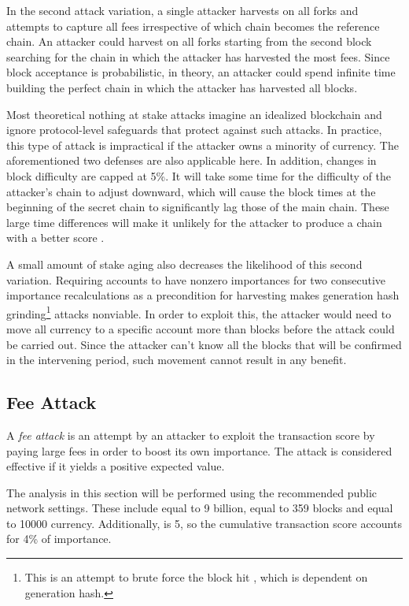 In the second attack variation, a single attacker harvests on all forks and attempts to capture all fees irrespective of which chain becomes the reference chain.
An attacker could harvest on all forks starting from the second block searching for the chain in which the attacker has harvested the most fees.
Since block acceptance is probabilistic, in theory, an attacker could spend infinite time building the perfect chain in which the attacker has harvested all blocks.

Most theoretical nothing at stake attacks imagine an idealized blockchain and ignore protocol-level safeguards that protect against such attacks.
In practice, this type of attack is impractical if the attacker owns a minority of currency.
The aforementioned two defenses are also applicable here.
In addition, changes in block difficulty  are capped at 5\%.
It will take some time for the difficulty of the attacker's chain to adjust downward, which will cause the block times at the beginning of the secret chain to significantly lag those of the main chain.
These large time differences will make it unlikely for the attacker to produce a chain with a better score .

A small amount of stake aging also decreases the likelihood of this second variation.
Requiring accounts to have nonzero importances for two consecutive importance recalculations as a precondition for harvesting makes generation hash grinding\footnote{This is an attempt to brute force the block hit , which is dependent on generation hash.} attacks nonviable.
In order to exploit this, the attacker would need to move all currency to a specific account more than  blocks before the attack could be carried out.
Since the attacker can't know all the blocks that will be confirmed in the intervening period, such movement cannot result in any benefit.

\subsection{Fee Attack}
\label{sec:consensus:feeAttack}

A \emph{fee attack} is an attempt by an attacker to exploit the transaction score by paying large fees in order to boost its own importance.
The attack is considered effective if it yields a positive expected value.

The analysis in this section will be performed using the recommended public network settings.
These include  equal to 9 billion,  equal to 359 blocks and  equal to 10000 currency.
Additionally,  is 5, so the cumulative transaction score accounts for 4\% of importance.

